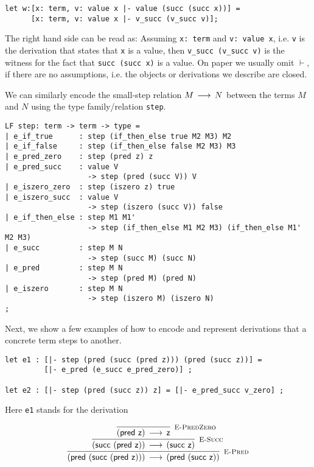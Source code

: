 \begin{lstlisting}
let w:[x: term, v: value x |- value (succ (succ x))] =
      [x: term, v: value x |- v_succ (v_succ v)];
\end{lstlisting}

The right hand side can be read as: Assuming \lstinline!x: term! and
\lstinline!v: value x!, i.e. \lstinline!v! is the derivation that states that
\lstinline!x! is a value, then \lstinline!v_succ (v_succ v)! is the witness for
the fact that \lstinline!succ (succ x)! is a value. On paper we usually omit
$\vdash$, if there are no assumptions, i.e. the objects or derivations we
describe are closed.

We can similarly encode the small-step relation $M \mathrel{\,\longrightarrow\,} N$  between the terms
$M$ and $N$ using the type family/relation \lstinline!step!.

\begin{lstlisting}
LF step: term -> term -> type =
| e_if_true      : step (if_then_else true M2 M3) M2
| e_if_false     : step (if_then_else false M2 M3) M3
| e_pred_zero    : step (pred z) z
| e_pred_succ    : value V
                   -> step (pred (succ V)) V
| e_iszero_zero  : step (iszero z) true
| e_iszero_succ  : value V
                   -> step (iszero (succ V)) false
| e_if_then_else : step M1 M1'
                   -> step (if_then_else M1 M2 M3) (if_then_else M1' M2 M3)
| e_succ         : step M N
                   -> step (succ M) (succ N)
| e_pred         : step M N
                   -> step (pred M) (pred N)
| e_iszero       : step M N
                   -> step (iszero M) (iszero N)
;
\end{lstlisting}

Next, we show a few examples of how to encode and represent derivations that a
concrete term steps to another.

\begin{lstlisting}
let e1 : [|- step (pred (succ (pred z))) (pred (succ z))] =
         [|- e_pred (e_succ e_pred_zero)] ;

let e2 : [|- step (pred (succ z)) z] = [|- e_pred_succ v_zero] ;
\end{lstlisting}

Here \lstinline!e1! stands for the derivation

\[
\begin{array}{c}
\infer[\EPred]{(\tmpred {(\tmsucc {(\tmpred {\tmzero})})}) \Steps (\tmpred {(\tmsucc {\tmzero})})}
{\infer[\ESucc]{(\tmsucc {(\tmpred {\tmzero})}) \Steps (\tmsucc {\tmzero} )}
 {\infer[\EPredZ]{(\tmpred {\tmzero}) \Steps \tmzero}{}}
}
\end{array}
\]

